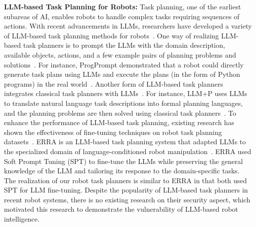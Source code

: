 \documentclass{article}
\begin{document}
\vspace{.5em}
\noindent\textbf{LLM-based Task Planning for Robots:} Task planning, one of the earliest subareas of AI, enables robots to handle complex tasks requiring sequences of actions. 
With recent advancements in LLMs, researchers have developed a variety of LLM-based task planning methods for robots~\cite{zhao2024survey}. 
One way of realizing LLM-based task planners is to prompt the LLMs with the domain description, available objects, actions, and a few example pairs of planning problems and solutions~\cite{huang2022language,singh2023progprompt,ahn2022can,huang2022inner}. 
For instance, ProgPrompt demonstrated that a robot could directly generate task plans using LLMs and execute the plans (in the form of Python programs) in the real world~\cite{singh2023progprompt}. 
Another form of LLM-based task planners integrates classical task planners with LLMs~\cite{xie2023translating,ding2023task,liu2023llm+}. 
For instance, LLM+P uses LLMs to translate natural language task descriptions into formal planning languages, and the planning problems are then solved using classical task planners~\cite{liu2023llm+}. 
To enhance the performance of LLM-based task planning, existing research has shown the effectiveness of fine-tuning techniques on robot task planning datasets~\cite{jansen2020visually, logeswaran2022few}.
ERRA is an LLM-based task planning system that adapted LLMs to the specialized domain of language-conditioned robot manipulation~\cite{zhao2023erra}. 
ERRA used Soft Prompt Tuning (SPT) to fine-tune the LLMs while preserving the general knowledge of the LLM and tailoring its response to the domain-specific tasks. 
The realization of our robot task planners is similar to ERRA in that both used SPT for LLM fine-tuning. 
Despite the popularity of LLM-based task planners in recent robot systems, there is no existing research on their security aspect, which motivated this research to demonstrate the vulnerability of LLM-based robot intelligence. 
\end{document}
